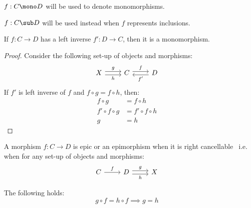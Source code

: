\begin{remark}
  $f:C\mono D$ will be used to denote monomorphisms.
\end{remark}

\begin{remark}
  $f:C\sub D$ will be used instead when $f$ represents inclusions.
\end{remark}

\begin{theorem}\label{thm:left_inverse_implies_mono}

  If $f:C\to D$ has a left inverse $f':D\to C$, then it is a monomorphism.

  \begin{proof}
    Consider the following set-up of objects and morphisms:
    \[\begin{tikzcd}[ampersand replacement=\&]
      X \& C \& D
      \arrow["f", shift left=1, from=1-2, to=1-3]
      \arrow["g", shift left=1, from=1-1, to=1-2]
      \arrow["h"', shift right=1, from=1-1, to=1-2]
      \arrow["{f'}", shift left=1, from=1-3, to=1-2]
    \end{tikzcd}\]
    If $f'$ is left inverse of $f$ and $f\circ g = f\circ h$, then:
    \[
      \begin{aligned}
        f\circ g &= f\circ h\\
        f'\circ f \circ g &= f'\circ f\circ h\\
        g &= h
      \end{aligned}
    \]
  \end{proof}
  \vspace{-\baselineskip}
\end{theorem}

\begin{definition}[Epimorphism]
  A morphism $f:C\to D$ is epic or an epimorphism when it is right
  cancellable~\parencite[p.~19]{lane:working_mathematician} i.e. when for any
  set-up of objects and morphisms:
  \[\begin{tikzcd}[ampersand replacement=\&]
    C \& D \& X
    \arrow["h"', shift right=1, from=1-2, to=1-3]
    \arrow["f", from=1-1, to=1-2]
    \arrow["g", shift left=1, from=1-2, to=1-3]
  \end{tikzcd}\]

  The following holds:
  \[g \circ f = h \circ f \implies g = h\]
\end{definition}

